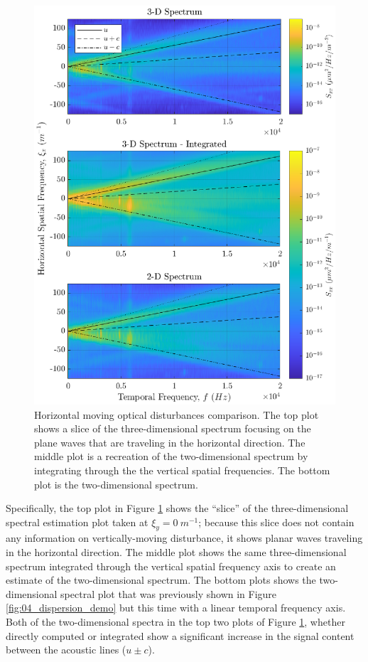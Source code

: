 \begin{figure}
  \centering
  \includegraphics{../matlab/04_dispersion_analysis/dispersion_comparison.eps}
  \caption{Horizontal moving optical disturbances comparison. The top plot shows a slice of the three-dimensional spectrum focusing on the plane waves that are traveling in the horizontal direction. The middle plot is a recreation of the two-dimensional spectrum by integrating through the the vertical spatial frequencies. The bottom plot is the two-dimensional spectrum.}
  \label{fig:04_dispersion_comparison}
\end{figure}
Specifically, the top plot in Figure \ref{fig:04_dispersion_comparison} shows the ``slice'' of the three-dimensional spectral estimation plot taken at $\xi_y=0\ m^{-1}$; because this slice does not contain any information on vertically-moving disturbance, it shows planar waves traveling in the horizontal direction.
The middle plot shows the same three-dimensional spectrum integrated through the vertical spatial frequency axis to create an estimate of the two-dimensional spectrum.
The bottom plots shows the two-dimensional spectral plot that was previously shown in Figure \ref{fig:04_dispersion_demo} but this time with a linear temporal frequency axis.
Both of the two-dimensional spectra in the top two plots of Figure \ref{fig:04_dispersion_comparison}, whether directly computed or integrated show a significant increase in the signal content between the acoustic lines ($u\pm c$).

